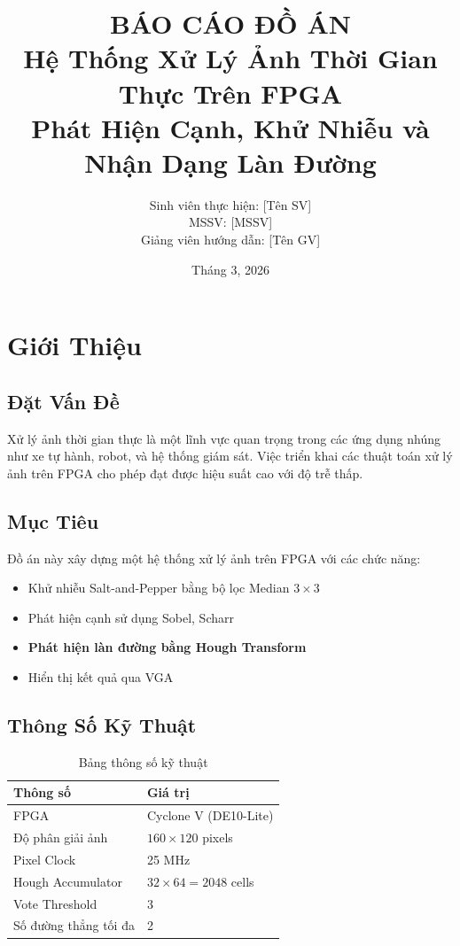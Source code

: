 \documentclass[12pt,a4paper]{report}
\title{
    \textbf{BÁO CÁO ĐỒ ÁN} \\[0.5cm]
    \Large Hệ Thống Xử Lý Ảnh Thời Gian Thực Trên FPGA \\
    Phát Hiện Cạnh, Khử Nhiễu và Nhận Dạng Làn Đường
}
\author{
    Sinh viên thực hiện: [Tên SV] \\
    MSSV: [MSSV] \\[0.5cm]
    Giảng viên hướng dẫn: [Tên GV]
}
\date{Tháng 3, 2026}
\begin{document}
\maketitle
\tableofcontents

\chapter{Giới Thiệu}

\section{Đặt Vấn Đề}
Xử lý ảnh thời gian thực là một lĩnh vực quan trọng trong các ứng dụng nhúng như xe tự hành, robot, và hệ thống giám sát. Việc triển khai các thuật toán xử lý ảnh trên FPGA cho phép đạt được hiệu suất cao với độ trễ thấp.

\section{Mục Tiêu}
Đồ án này xây dựng một hệ thống xử lý ảnh trên FPGA với các chức năng:
\begin{itemize}
    \item Khử nhiễu Salt-and-Pepper bằng bộ lọc Median $3\times3$
    \item Phát hiện cạnh sử dụng Sobel, Scharr
    \item \textbf{Phát hiện làn đường bằng Hough Transform}
    \item Hiển thị kết quả qua VGA
\end{itemize}

\section{Thông Số Kỹ Thuật}
\begin{table}[h]
\centering
\begin{tabular}{|l|l|}
\hline
\textbf{Thông số} & \textbf{Giá trị} \\
\hline
FPGA & Cyclone V (DE10-Lite) \\
Độ phân giải ảnh & $160 \times 120$ pixels \\
Pixel Clock & 25 MHz \\
Hough Accumulator & $32 \times 64 = 2048$ cells \\
Vote Threshold & 3 \\
Số đường thẳng tối đa & 2 \\
\hline
\end{tabular}
\caption{Bảng thông số kỹ thuật}
\end{table}
\end{document}
